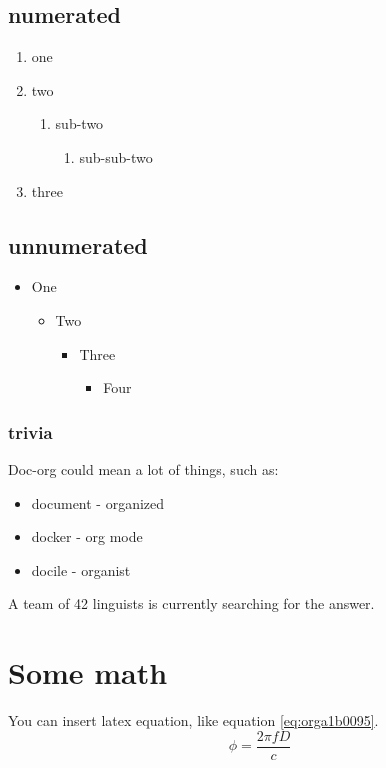 \subsection{numerated}
\label{sec:org91a21f2}
\begin{enumerate}
\item one
\item two
\begin{enumerate}
\item sub-two
\begin{enumerate}
\item sub-sub-two
\end{enumerate}
\end{enumerate}
\item three
\end{enumerate}

\subsection{unnumerated}
\label{sec:org0226419}
\begin{itemize}
\item One
\begin{itemize}
\item Two
\begin{itemize}
\item Three
\begin{itemize}
\item Four
\end{itemize}
\end{itemize}
\end{itemize}
\end{itemize}

\subsubsection{trivia}
\label{sec:org5990ed8}
Doc-org could mean a lot of things, such as:
\begin{itemize}
\item document - organized
\item docker - org mode
\item docile - organist
\end{itemize}
A team of 42 linguists is currently searching for the answer.

\section{Some math}
\label{sec:org2c504e7}
You can insert latex equation, like equation \ref{eq:orga1b0095}.
\begin{equation}
\label{eq:orga1b0095}
\phi = \frac{2\pi fD}{c}
\end{equation}

